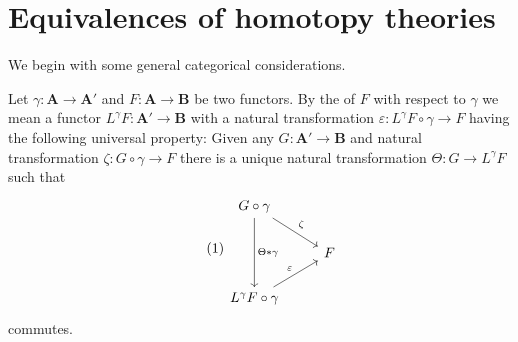 \documentclass[../main]{subfiles}
\begin{document}
\section{Equivalences of homotopy theories}\label{sec:1.4}

We begin with some general categorical considerations.
\begin{definition}\label{def:1.4.1}
Let $\gamma : \mathbf{A} \longrightarrow  \mathbf{A}'$ and $F : \mathbf{A} \longrightarrow  \mathbf{B}$ be two functors. By the  of $F$ with respect to $\gamma$ we mean a functor $L^\gamma F: \mathbf{A}' \longrightarrow  \mathbf{B}$ with a natural transformation $\varepsilon : L^\gamma F \circ \gamma \longrightarrow  F$ having the following universal property: Given any $G : \mathbf{A}' \longrightarrow  \mathbf{B}$ and natural transformation $\zeta : G \circ \gamma \longrightarrow  F$ there is a unique natural transformation $\Theta : G \longrightarrow  L^\gamma F$ such that
\[\tag{1}\label{diag:1.4.1}
\begin{tikzcd}
    G\circ \gamma \arrow[dd,"\Theta\ast \gamma"] \arrow[dr,"\zeta"] & \\
    & F \\
    L^\gamma F \circ \gamma \arrow[ur,"\varepsilon"] & 
\end{tikzcd}
\]
commutes.
\end{definition}
\end{document}
